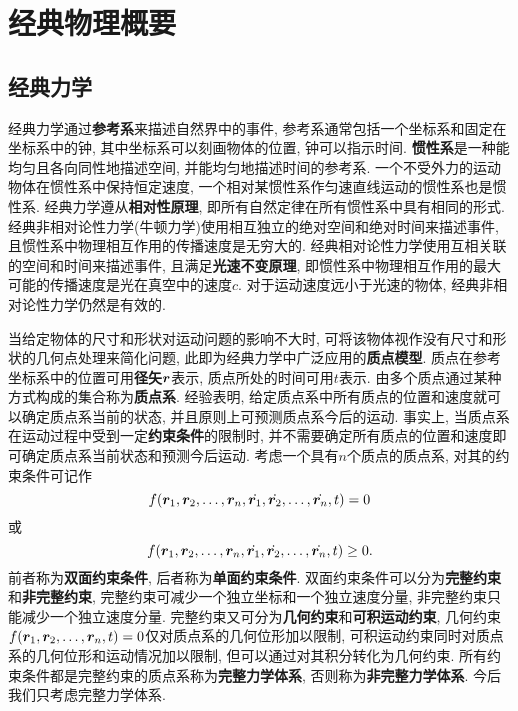 \chapter[经典物理概要]{经典物理概要}
\section[经典力学]{经典力学}\label{经典力学}
经典力学通过\textbf{参考系}来描述自然界中的事件, 参考系通常包括一个坐标系和固定在坐标系中的钟, 其中坐标系可以刻画物体的位置, 钟可以指示时间. \textbf{惯性系}是一种能均匀且各向同性地描述空间, 并能均匀地描述时间的参考系. 一个不受外力的运动物体在惯性系中保持恒定速度, 一个相对某惯性系作匀速直线运动的惯性系也是惯性系. 经典力学遵从\textbf{相对性原理}, 即所有自然定律在所有惯性系中具有相同的形式. 经典非相对论性力学(牛顿力学)使用相互独立的绝对空间和绝对时间来描述事件, 且惯性系中物理相互作用的传播速度是无穷大的. 经典相对论性力学使用互相关联的空间和时间来描述事件, 且满足\textbf{光速不变原理}, 即惯性系中物理相互作用的最大可能的传播速度是光在真空中的速度$ c $. 对于运动速度远小于光速的物体, 经典非相对论性力学仍然是有效的.

当给定物体的尺寸和形状对运动问题的影响不大时, 可将该物体视作没有尺寸和形状的几何点处理来简化问题, 此即为经典力学中广泛应用的\textbf{质点模型}. 质点在参考坐标系中的位置可用\textbf{径矢}$ \vb*{r} $表示, 质点所处的时间可用$ t $表示. 由多个质点通过某种方式构成的集合称为\textbf{质点系}. 经验表明, 给定质点系中所有质点的位置和速度就可以确定质点系当前的状态, 并且原则上可预测质点系今后的运动. 事实上, 当质点系在运动过程中受到一定\textbf{约束条件}的限制时, 并不需要确定所有质点的位置和速度即可确定质点系当前状态和预测今后运动. 考虑一个具有$ n $个质点的质点系, 对其的约束条件可记作
\begin{equation*}
    f(\vb*{r}_1,\vb*{r}_2,\ldots,\vb*{r}_n,\dot{\vb*{r}_1},\dot{\vb*{r}_2},\ldots,\dot{\vb*{r}_n},t)=0
\end{equation*}
或
\begin{equation*}
    f(\vb*{r}_1,\vb*{r}_2,\ldots,\vb*{r}_n,\dot{\vb*{r}_1},\dot{\vb*{r}_2},\ldots,\dot{\vb*{r}_n},t) \geq 0.
\end{equation*}
前者称为\textbf{双面约束条件}, 后者称为\textbf{单面约束条件}. 双面约束条件可以分为\textbf{完整约束}和\textbf{非完整约束}, 完整约束可减少一个独立坐标和一个独立速度分量, 非完整约束只能减少一个独立速度分量. 完整约束又可分为\textbf{几何约束}和\textbf{可积运动约束}, 几何约束$ f(\vb*{r}_1,\vb*{r}_2,\ldots,\vb*{r}_n,t)=0 $仅对质点系的几何位形加以限制, 可积运动约束同时对质点系的几何位形和运动情况加以限制, 但可以通过对其积分转化为几何约束. 所有约束条件都是完整约束的质点系称为\textbf{完整力学体系}, 否则称为\textbf{非完整力学体系}. 今后我们只考虑完整力学体系.

